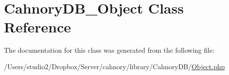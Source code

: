 \hypertarget{class_cahnory_d_b___object}{
\section{CahnoryDB\_\-Object Class Reference}
\label{class_cahnory_d_b___object}
}


The documentation for this class was generated from the following file:\begin{CompactItemize}
\item 
/Users/studio2/Dropbox/Server/cahnory/library/CahnoryDB/\hyperlink{_object_8php}{Object.php}\end{CompactItemize}
